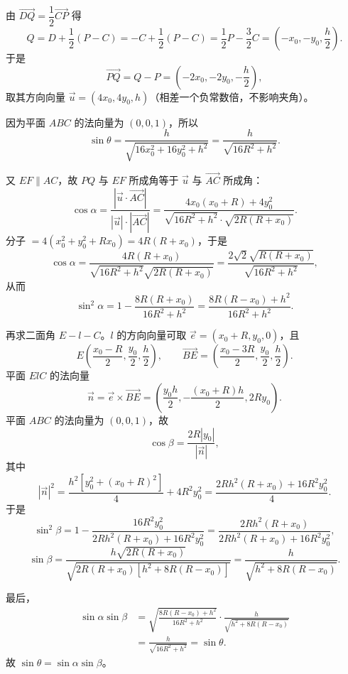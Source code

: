 \begin{answer}
由 $\overrightarrow{DQ}=\dfrac12\overrightarrow{CP}$ 得
\nopagebreak[4]
\[Q=D+\frac12(P-C)
=-C+\frac12(P-C)=\frac12P-\frac32C
=\left(-x_0,-y_0,\frac h2\right).\]
于是
\nopagebreak[4]
\[\overrightarrow{PQ}=Q-P=\left(-2x_0,-2y_0,-\frac h2\right),\]
取其方向向量 $\vec u=(4x_0,4y_0,h)$（相差一个负常数倍，不影响夹角）。

因为平面 $ABC$ 的法向量为 $(0,0,1)$，所以
\nopagebreak[4]
\[\sin\theta=\frac{h}{\sqrt{16x_0^2+16y_0^2+h^2}}
=\frac{h}{\sqrt{16R^2+h^2}}.\]

又 $EF\parallel AC$，故 $PQ$ 与 $EF$ 所成角等于 $\vec u$ 与 $\overrightarrow{AC}$ 所成角：
\nopagebreak[4]
\[\cos\alpha
=\frac{\left|\vec u\cdot\overrightarrow{AC}\right|}{|\vec u|\cdot|\overrightarrow{AC}|}
=\frac{4x_0(x_0+R)+4y_0^2}{\sqrt{16R^2+h^2}\cdot\sqrt{2R(R+x_0)}}.\]
分子 $=4\left(x_0^2+y_0^2+Rx_0\right)=4R(R+x_0)$，于是
\nopagebreak[4]
\[\cos\alpha=\frac{4R(R+x_0)}{\sqrt{16R^2+h^2}\sqrt{2R(R+x_0)}}
=\frac{2\sqrt2\sqrt{R(R+x_0)}}{\sqrt{16R^2+h^2}},\]
从而
\nopagebreak[4]
\[\sin^2\alpha=1-\frac{8R(R+x_0)}{16R^2+h^2}
=\frac{8R(R-x_0)+h^2}{16R^2+h^2}.\]

再求二面角 $E-l-C$。$l$ 的方向向量可取 $\vec e=(x_0+R,y_0,0)$，且
\nopagebreak[4]
\[E\left(\frac{x_0-R}{2},\frac{y_0}{2},\frac h2\right),\qquad
\overrightarrow{BE}=\left(\frac{x_0-3R}{2},\frac{y_0}{2},\frac h2\right).\]
平面 $ElC$ 的法向量
\nopagebreak[4]
\[\vec n=\vec e\times\overrightarrow{BE}
=\left(\frac{y_0h}{2},-\frac{(x_0+R)h}{2},2Ry_0\right).\]
平面 $ABC$ 的法向量为 $(0,0,1)$，故
\nopagebreak[4]
\[\cos\beta=\frac{2R|y_0|}{|\vec n|},\]
其中
\nopagebreak[4]
\[|\vec n|^2=\frac{h^2\left[y_0^2+(x_0+R)^2\right]}{4}+4R^2y_0^2
=\frac{2Rh^2(R+x_0)+16R^2y_0^2}{4}.\]
于是
\nopagebreak[4]
\[\sin^2\beta=1-\frac{16R^2y_0^2}{2Rh^2(R+x_0)+16R^2y_0^2}
=\frac{2Rh^2(R+x_0)}{2Rh^2(R+x_0)+16R^2y_0^2},\]
\nopagebreak[4]
\[\sin\beta=\frac{h\sqrt{2R(R+x_0)}}{\sqrt{2R(R+x_0)\left[h^2+8R(R-x_0)\right]}}
=\frac{h}{\sqrt{h^2+8R(R-x_0)}}.\]

最后，
\nopagebreak[4]
\[\begin{aligned}
\sin\alpha\sin\beta
&=\sqrt{\frac{8R(R-x_0)+h^2}{16R^2+h^2}}\cdot
\frac{h}{\sqrt{h^2+8R(R-x_0)}}\\
&=\frac{h}{\sqrt{16R^2+h^2}}=\sin\theta.
\end{aligned}\]
故 $\sin\theta=\sin\alpha\sin\beta$。



\end{answer}
